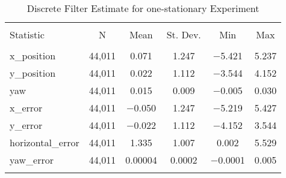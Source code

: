
\begin{table}[h] \centering 
  \caption{Discrete Filter Estimate for one-stationary Experiment} 
  \label{tab:one_stationary_discrete_summary} 
\begin{tabular}{@{\extracolsep{5pt}}lccccc} 
\\[-1.8ex]\hline 
\hline \\[-1.8ex] 
Statistic & \multicolumn{1}{c}{N} & \multicolumn{1}{c}{Mean} & \multicolumn{1}{c}{St. Dev.} & \multicolumn{1}{c}{Min} & \multicolumn{1}{c}{Max} \\ 
\hline \\[-1.8ex] 
x\_position & 44,011 & 0.071 & 1.247 & $-$5.421 & 5.237 \\ 
y\_position & 44,011 & 0.022 & 1.112 & $-$3.544 & 4.152 \\ 
yaw & 44,011 & 0.015 & 0.009 & $-$0.005 & 0.030 \\ 
x\_error & 44,011 & $-$0.050 & 1.247 & $-$5.219 & 5.427 \\ 
y\_error & 44,011 & $-$0.022 & 1.112 & $-$4.152 & 3.544 \\ 
horizontal\_error & 44,011 & 1.335 & 1.007 & 0.002 & 5.529 \\ 
yaw\_error & 44,011 & 0.00004 & 0.0002 & $-$0.0001 & 0.005 \\ 
\hline \\[-1.8ex] 
\end{tabular} 
\end{table} 

